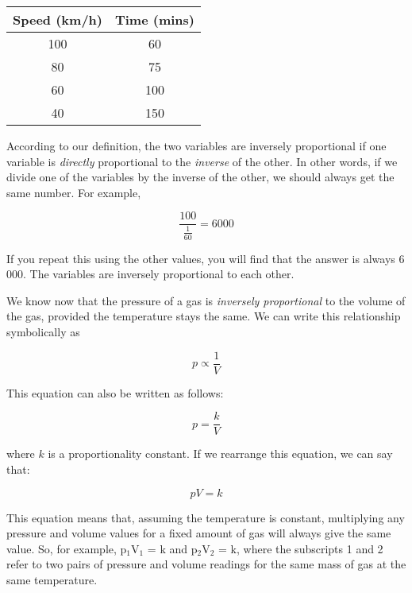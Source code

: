 \begin{enumerate}
{\begin{center}
\begin{tabular}{|c|c|}\hline
\textbf{Speed} (km/h) & \textbf{Time} (mins) \\\hline
100 & 60 \\\hline
80 & 75 \\\hline
60 & 100 \\\hline
40 & 150 \\\hline
\end{tabular}
\end{center}

According to our definition, the two variables are inversely proportional if one variable is \textit{directly} proportional to the \textit{inverse} of the other. In other words, if we divide one of the variables by the inverse of the other, we should always get the same number. For example,

\begin{equation*}
\dfrac{100}{\frac{1}{60}} = 6000
\end{equation*}

If you repeat this using the other values, you will find that the answer is always 6 000. The variables are inversely proportional to each other.
}


\end{enumerate}



We know now that the pressure of a gas is \textit{inversely proportional} to the volume of the gas, provided the temperature stays the same. We can write this relationship symbolically as

\begin{equation*}
p \propto \frac{1}{V}
\end{equation*}

This equation can also be written as follows:

\begin{equation*}
p = \frac{k}{V}
\end{equation*}

where $k$ is a proportionality constant. If we rearrange this equation, we can say that:


\begin{equation*}
pV = k
\end{equation*}

This equation means that, assuming the temperature is constant, multiplying any pressure and volume values for a fixed amount of gas will always give the same value. So, for example, p$_{1}$V$_{1}$ = k and p$_{2}$V$_{2}$ = k, where the subscripts 1 and 2 refer to two pairs of pressure and volume readings for the same mass of gas at the same temperature.

